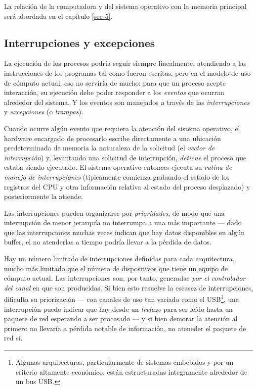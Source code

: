 \documentclass[11pt,fleqn]{book} %
\begin{document}
La relación de la computadora y del sistema operativo con la memoria principal 
será abordada en el capítulo \ref{sec-5}.
\subsection{Interrupciones y excepciones}
\label{sec-2-2-2}
\label{HW_interrupciones}


La ejecución de los procesos podría seguir siempre linealmente,
atendiendo a las instrucciones de los programas tal como fueron escritas,
pero en el modelo de uso de cómputo actual, eso no serviría de
mucho: para que un proceso acepte interacción, su ejecución debe poder
responder a los \emph{eventos} que ocurran alrededor del sistema. Y los
eventos son manejados a través de las \emph{interrupciones} y \emph{excepciones}
(o \emph{trampas}).

Cuando ocurre algún evento que requiera la atención del sistema
operativo, el hardware encargado de procesarlo escribe directamente a
una ubicación predeterminada de memoria la naturaleza de la solicitud
(el \emph{vector de interrupción}) y, levantando una solicitud de
interrupción, \emph{detiene} el proceso que estaba siendo
ejecutado. El sistema operativo entonces ejecuta su \emph{rutina de manejo de interrupciones} (típicamente comienza grabando el estado de los
registros del CPU y otra información relativa al estado del proceso
desplazado) y posteriormente la atiende.

Las interrupciones pueden organizarse por \emph{prioridades}, de modo que
una interrupción de menor jerarquía no interrumpa a una más
importante — dado que las interrupciones muchas veces indican que hay
datos disponibles en algún buffer, el no atenderlas a tiempo podría
llevar a la pérdida de datos.

Hay un número limitado de interrupciones definidas para cada
arquitectura, mucho más limitado que el número de dispositivos que
tiene un equipo de cómputo actual. Las interrupciones son, por tanto,
generadas \emph{por el controlador del canal} en que son producidas. Si
bien esto resuelve la escasez de interrupciones, dificulta su
priorización — con canales de uso tan variado como el USB\footnote{Algunas
arquitecturas, particularmente de sistemas embebidos y por un criterio
altamente económico, están estructuradas íntegramente alrededor de un
bus USB. }, una interrupción puede indicar que hay desde un \emph{teclazo}
para ser leído hasta un paquete de red esperando a ser procesado — y
si bien demorar la atención al primero no llevaría a pérdida notable
de información, no ateneder el paquete de red sí.
\end{document}
